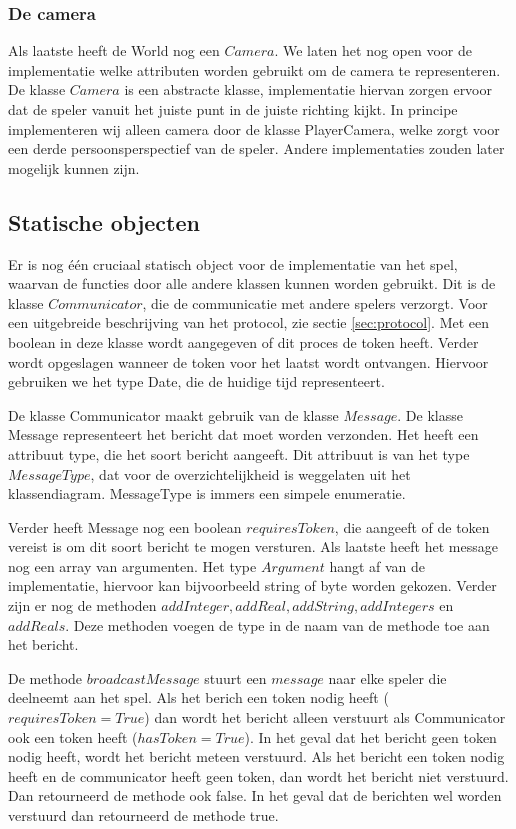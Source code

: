 \documentclass[a4paper,11pt]{article}
\newcommand{\protoref}{sectie \ref{sec:protocol}}
\begin{document}
\subsubsection{De camera}
Als laatste heeft de World nog een $Camera$. We laten het nog open voor de implementatie welke attributen worden gebruikt om de camera te representeren. De klasse $Camera$ is een abstracte klasse, implementatie hiervan zorgen ervoor dat de speler vanuit het juiste punt in de juiste richting kijkt. In principe implementeren wij alleen camera door de klasse PlayerCamera, welke zorgt voor een derde persoonsperspectief van de speler. Andere implementaties zouden later mogelijk kunnen zijn.

\subsection{Statische objecten}
Er is nog \'e\'en cruciaal statisch object voor de implementatie van het spel, waarvan de functies door alle andere klassen kunnen worden gebruikt. Dit is de klasse $Communicator$, die de communicatie met andere spelers verzorgt.  Voor een uitgebreide beschrijving van het protocol, zie \protoref. Met een boolean in deze klasse wordt aangegeven of dit proces de token heeft. Verder wordt opgeslagen wanneer de token voor het laatst wordt ontvangen. Hiervoor gebruiken we het type Date, die de huidige tijd representeert.

De klasse Communicator maakt gebruik van de klasse $Message$. De klasse Message representeert het bericht dat moet worden verzonden. Het heeft een attribuut type, die het soort bericht aangeeft. Dit attribuut is van het type $MessageType$, dat voor de overzichtelijkheid is weggelaten uit het klassendiagram. MessageType is immers een simpele enumeratie.

Verder heeft Message nog een boolean $requiresToken$, die aangeeft of de token vereist is om dit soort bericht te mogen versturen.  Als laatste heeft het message nog een array van argumenten. Het type $Argument$ hangt af van de implementatie, hiervoor kan bijvoorbeeld string of byte worden gekozen. Verder zijn er nog de methoden $addInteger, addReal, addString, addIntegers$ en $addReals$. Deze methoden voegen de type in de naam van de methode toe aan het bericht.

De methode $broadcastMessage$ stuurt een $message$ naar elke speler die deelneemt aan het spel. Als het berich een token nodig heeft ($requiresToken = True$) dan wordt het bericht alleen verstuurt als Communicator ook een token heeft ($hasToken = True$). In het geval dat het bericht geen token nodig heeft, wordt het bericht meteen verstuurd. Als het bericht een token nodig heeft en de communicator heeft geen token, dan wordt het bericht niet verstuurd. Dan retourneerd de methode ook false. In het geval dat de berichten wel worden verstuurd dan retourneerd de methode true.
\end{document}
